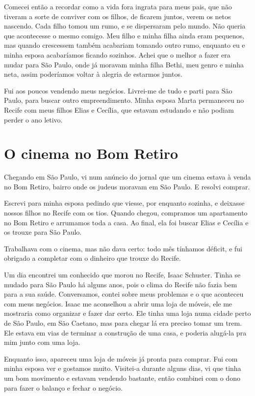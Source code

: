 Comecei então a recordar como a vida fora ingrata para meus pais, que não
tiveram a sorte de conviver com os filhos, de ficarem juntos, verem os
netos nascendo. Cada filho tomou um rumo, e se dispersaram
pelo mundo. Não queria que acontecesse o mesmo comigo. Meu filho e
minha filha ainda eram pequenos, mas quando crescessem também
acabariam tomando outro rumo, enquanto eu e minha esposa acabaríamos ficando sozinhos.
Achei que o melhor a fazer era mudar para São Paulo, onde já
moravam minha filha Bethi, meu genro e minha neta, assim poderíamos voltar à alegria de estarmos juntos.

Fui aos poucos vendendo meus negócios. Livrei-me de tudo e parti para São
Paulo, para buscar outro empreendimento. Minha esposa Marta
permaneceu no Recife com meus filhos Elias e Cecília, que estavam
estudando e não podiam perder o ano letivo.

\chapter{O cinema no Bom Retiro}

Chegando em São Paulo, vi num anúncio do jornal que um cinema estava à venda no Bom 
Retiro, bairro onde os judeus moravam em São Paulo. E 
resolvi comprar.

Escrevi para minha esposa pedindo que viesse, por enquanto sozinha, e
deixasse nossos filhos no Recife com os tios. Quando chegou, compramos 
um apartamento no Bom Retiro e arrumamos toda a casa. Ao final, ela foi 
buscar Elias e Cecília e os trouxe para São Paulo.

Trabalhava com o cinema, mas não dava certo: todo mês tínhamos  
déficit, e fui obrigado a completar com o dinheiro que trouxe do Recife.

Um dia encontrei um conhecido que morou no Recife, Isaac Schuster. 
Tinha se mudado para São Paulo há alguns anos, pois o clima do 
Recife não fazia bem para a sua saúde.
Conversamos, contei sobre meus problemas e o que aconteceu com meus negócios. Isaac me aconselhou a abrir uma loja
de móveis, ele me mostraria como organizar e fazer dar
certo. Ele tinha uma loja numa cidade perto de São Paulo, em São
Caetano, mas para chegar lá era preciso tomar um trem. Ele estava em vias de terminar a construção de uma casa, e poderia alugá-la pra mim junto com uma loja.

Enquanto isso, apareceu uma loja de móveis já pronta para comprar. 
Fui com minha esposa ver e gostamos muito. Visitei-a durante alguns
dias, vi que tinha um bom movimento e estavam vendendo bastante, então
combinei com o dono para fazer o balanço e fechar o negócio.

